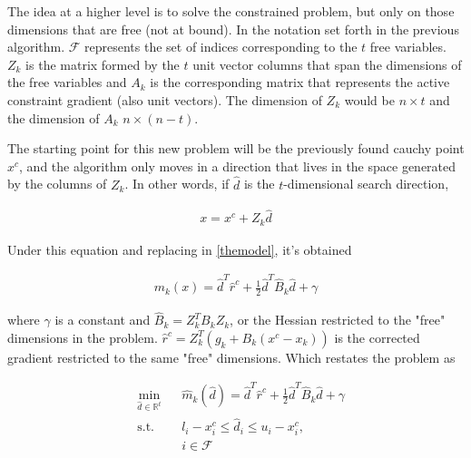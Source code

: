 The idea at a higher level is to solve the constrained problem, but only on those dimensions that are free (not at bound). In the notation set forth in the previous algorithm. $\mathcal{F}$ represents the set of indices corresponding to the $t$ free variables. $Z_k$ is the matrix formed by the $t$ unit vector columns that span the dimensions of the free variables and $A_k$ is the corresponding matrix that represents the active constraint gradient (also unit vectors). The dimension of $Z_k$ would be $n \times t$ and the dimension of $A_k$ $n \times (n - t)$.

The starting point for this new problem will be the previously found cauchy point $x^c$, and the algorithm only moves in a direction that lives in the space generated by the columns of $Z_k$. In other words, if $\hat{d}$ is the $t$-dimensional search direction,  

\begin{equation} \label{dirconst}
  \begin{aligned}
    x = x^c + Z_k \hat{d}
  \end{aligned}
\end{equation}

Under this equation and replacing in \ref{themodel}, it's obtained

\begin{equation} \label{themodelrestr}
  \begin{aligned}
    m_k(x) = \hat{d}^T\hat{r}^c + \frac{1}{2} \hat{d}^T \hat{B}_k \hat{d} + \gamma
  \end{aligned}
\end{equation}

where $\gamma$ is a constant and $\hat{B}_k = Z_k^T B_k Z_k$, or the Hessian restricted to the "free" dimensions in the problem. $\hat{r}^c = Z^T_k (g_k + B_k(x^c - x_k))$ is the corrected gradient restricted to the same "free" dimensions. Which restates the problem as

\begin{equation} \label{subproblem}
  \begin{aligned}
    & \underset{\hat{d} \in \mathbb{R}^t}{\text{min}} 
    & & \hat{m}_k(\hat{d}) = \hat{d}^T\hat{r}^c + \frac{1}{2} \hat{d}^T\hat{B}_k\hat{d} + \gamma \\
    & \text{s.t.}
    & & l_i - x_i^c \leq \hat{d}_i \leq u_i - x_i^c , \; \\
    & & & i \in \mathcal{F}
  \end{aligned}
\end{equation}

